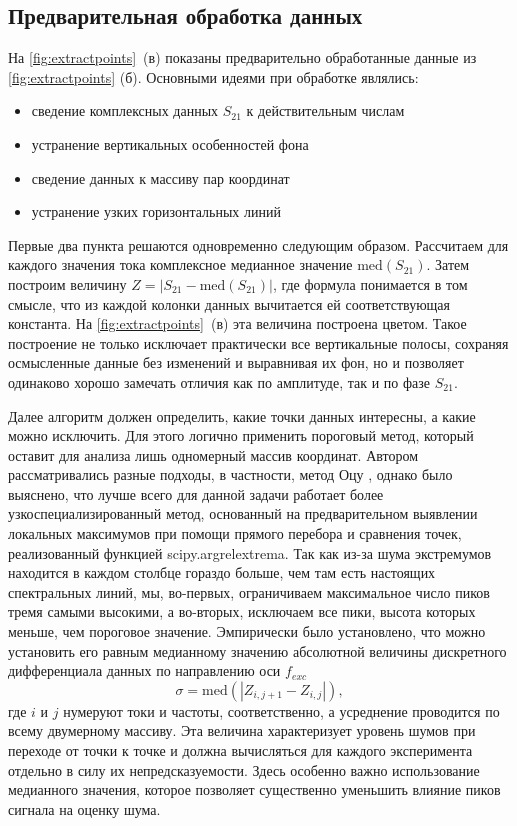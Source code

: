 \documentclass[14pt, a4paper]{extreport}
\numberwithin{equation}{section}
\begin{document}
	\subsection{Предварительная обработка данных}
	
	На \autoref{fig:extractpoints}~(в) показаны предварительно обработанные данные из \autoref{fig:extractpoints} (б). Основными идеями при обработке являлись:
	\begin{itemize}
		\item сведение комплексных данных $S_{21}$ к действительным числам
		\item устранение вертикальных особенностей фона
		\item сведение данных к массиву пар координат 
		\item устранение узких горизонтальных линий
	\end{itemize}

	Первые два пункта решаются одновременно следующим образом. Рассчитаем для каждого значения тока комплексное медианное значение $\text{med}(S_{21})$. Затем построим величину $Z = |S_{21} - \text{med}(S_{21})|$, где формула понимается в том смысле, что из каждой колонки данных вычитается ей соответствующая константа. На \autoref{fig:extractpoints}~(в) эта величина построена цветом. Такое построение не только исключает практически все вертикальные полосы, сохраняя осмысленные данные без изменений и выравнивая их фон, но и позволяет одинаково хорошо замечать отличия как по амплитуде, так и по фазе $S_{21}$.
	
	Далее алгоритм должен определить, какие точки данных интересны, а какие можно исключить. Для этого логично применить пороговый метод, который оставит для анализа лишь одномерный массив координат. Автором рассматривались разные подходы, в частности, метод Оцу \cite{otsu1979}, однако было выяснено, что лучше всего для данной задачи работает более узкоспециализированный метод, основанный на предварительном выявлении локальных максимумов при помощи прямого перебора и сравнения точек, реализованный функцией \foreignlanguage{english}{scipy.argrelextrema}. Так как из-за шума экстремумов находится в каждом столбце гораздо больше, чем там есть настоящих спектральных линий, мы, во-первых, ограничиваем максимальное число пиков тремя самыми высокими, а во-вторых, исключаем все пики, высота которых меньше, чем пороговое значение. Эмпирически было установлено, что можно установить его равным медианному значению абсолютной величины дискретного дифференциала данных по направлению оси $f_{exc}$
	\begin{equation}
		\sigma = \text{med}(|Z_{i,j+1} - Z_{i, j}|),
	\end{equation}
	где $i$ и $j$ нумеруют токи и частоты, соответственно, а усреднение проводится по всему двумерному массиву. Эта величина характеризует уровень шумов при переходе от точки к точке и должна вычисляться для каждого эксперимента отдельно в силу их непредсказуемости. Здесь особенно важно использование медианного значения, которое позволяет существенно уменьшить влияние пиков сигнала на оценку шума.
	
\end{document}
